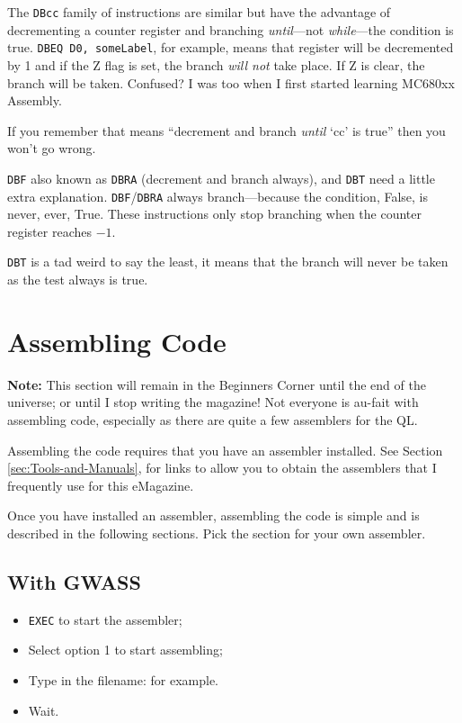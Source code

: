 The \texttt{DBcc} family of instructions are similar but have the advantage of decrementing a counter register and branching \emph{until}---not \emph{while}---the condition is true. \texttt{DBEQ D0, someLabel}, for example, means that register  will be decremented by 1 and if the Z flag is set, the branch \emph{will not} take place. If Z is clear, the branch will be taken. Confused? I was too when I first started learning MC680xx Assembly.

If you remember that  means ``decrement and branch \emph{until} `cc' is true'' then you won't go wrong.

\texttt{DBF} also known as \texttt{DBRA} (decrement and branch always), and \texttt{DBT} need a little extra explanation. \texttt{DBF}/\texttt{DBRA} always branch---because the condition, False, is never, ever, True. These instructions only stop branching when the counter register reaches $-1$. 

\texttt{DBT} is a tad weird to say the least, it means that the branch will never be taken as the test always is true.


\section{Assembling Code}

\textbf{Note:} This section will remain in the Beginners Corner until the end of the universe; or until I stop writing the magazine! Not everyone is au-fait with assembling code, especially as there are quite a few assemblers for the QL.

Assembling the code requires that you have an assembler installed.
See Section \ref{sec:Tools-and-Manuals}, 
for links to allow you to obtain the assemblers that I frequently
use for this eMagazine.

Once you have installed an assembler, assembling the code is simple
and is described in the following sections. Pick the section for your
own assembler.

\subsection{With GWASS}
\begin{itemize}
\item \texttt{EXEC}  to start the assembler;
\item Select option 1 to start assembling;
\item Type in the filename:  for example.
\item Wait.
\end{itemize}

